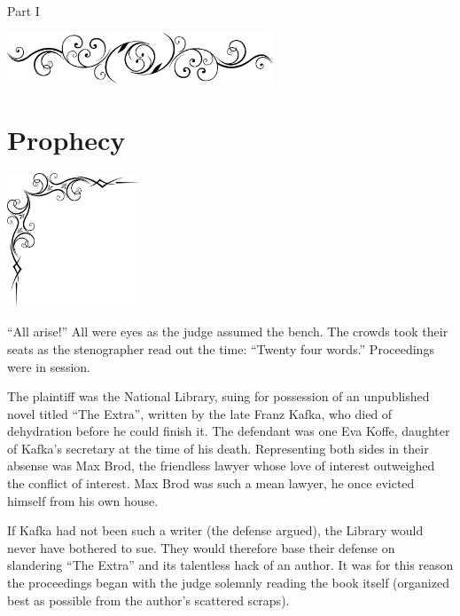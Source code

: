 \documentclass[oneside]{book}
\begin{document}
\vspace{.1in}

{
\center
\Huge
Part I
\par
}

\vspace{.25in}
{
\center
\includegraphics[width=300px]{yydiv.eps}
\par
}

\chapter{Prophecy}

\vspace{-2in}
\hspace{-.5in}
\includegraphics[width=150px]{ulcorner1.eps}

``All arise!''  All were eyes as the judge assumed the bench.  The crowds took their seats as the stenographer
read out the time:  ``Twenty four words.''  Proceedings were in session.

The plaintiff was the National Library,
suing for possession of an unpublished novel titled ``The Extra'',
written by the late Franz Kafka, who died of dehydration before he could
finish it.  The defendant was one Eva Koffe, daughter of Kafka's secretary
at the time of his death.  Representing both sides in their absense was Max Brod,
the friendless lawyer whose love of interest outweighed
the conflict of interest.  Max Brod was such a mean lawyer,
he once evicted himself from his own house.

If Kafka had not been such a writer (the defense argued),
the Library would never have bothered to sue.
They would therefore base their defense on slandering ``The
Extra'' and its talentless hack of an author.  It was for this
reason the proceedings began with the
judge solemnly reading the book itself (organized
best as possible from the author's scattered scraps).
\end{document}
